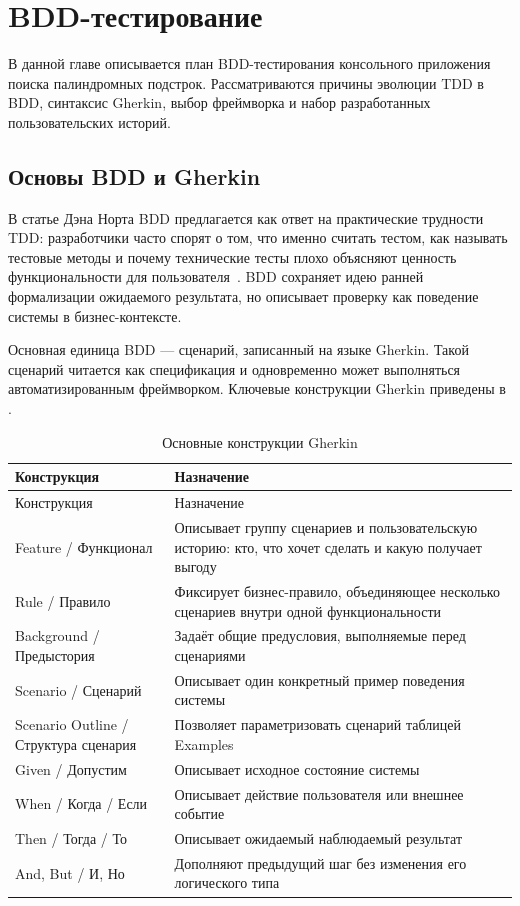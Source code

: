 \chapter{BDD-тестирование} \label{ch1}

В данной главе описывается план BDD-тестирования консольного приложения поиска палиндромных подстрок. Рассматриваются причины эволюции TDD в BDD, синтаксис Gherkin, выбор фреймворка и набор разработанных пользовательских историй.

\section{Основы BDD и Gherkin} \label{ch1:sec1}

В статье Дэна Норта BDD предлагается как ответ на практические трудности TDD: разработчики часто спорят о том, что именно считать тестом, как называть тестовые методы и почему технические тесты плохо объясняют ценность функциональности для пользователя~\cite{north-bdd}. BDD сохраняет идею ранней формализации ожидаемого результата, но описывает проверку как поведение системы в бизнес-контексте.

Основная единица BDD --- сценарий, записанный на языке Gherkin. Такой сценарий читается как спецификация и одновременно может выполняться автоматизированным фреймворком. Ключевые конструкции Gherkin приведены в .

\noindent
\begingroup
\centering
\small
\begin{longtable}[c]{|p{3.2cm}|p{11.8cm}|}
    \caption{Основные конструкции Gherkin}
    \label{tab:gherkin}
    \\
    \hline
    Конструкция & Назначение \\ \hline
    \endfirsthead
    \hline
    Конструкция & Назначение \\ \hline
    \endhead
    \hline
    \endfoot
    Feature / Функционал & Описывает группу сценариев и пользовательскую историю: кто, что хочет сделать и какую получает выгоду \\ \hline
    Rule / Правило & Фиксирует бизнес-правило, объединяющее несколько сценариев внутри одной функциональности \\ \hline
    Background / Предыстория & Задаёт общие предусловия, выполняемые перед сценариями \\ \hline
    Scenario / Сценарий & Описывает один конкретный пример поведения системы \\ \hline
    Scenario Outline / Структура сценария & Позволяет параметризовать сценарий таблицей Examples \\ \hline
    Given / Допустим & Описывает исходное состояние системы \\ \hline
    When / Когда / Если & Описывает действие пользователя или внешнее событие \\ \hline
    Then / Тогда / То & Описывает ожидаемый наблюдаемый результат \\ \hline
    And, But / И, Но & Дополняют предыдущий шаг без изменения его логического типа \\ \hline
\end{longtable}
\normalsize
\endgroup

